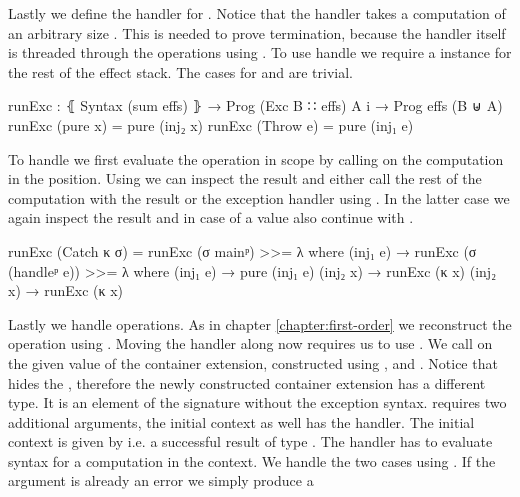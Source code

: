 Lastly we define the handler for .
Notice that the handler takes a computation of an arbitrary size
.
This is needed to prove termination, because the handler itself is threaded
through the  operations using
.
To use handle we require a  instance for the rest of the
effect stack.
The cases for  and
 are trivial.

\begin{code}
runExc : ⦃ Syntax (sum effs) ⦄ → Prog (Exc B ∷ effs) A {i} → Prog effs (B ⊎ A)
runExc (pure x)     = pure (inj₂ x)
runExc (Throw e)    = pure (inj₁ e)
\end{code}
To handle  we first evaluate the operation in
scope by calling  on the computation in the
 position.
Using \AgdaFunction{>>=} we can inspect the result and either call the rest of
the computation  with the result or the exception handler using
.
In the latter case we again inspect the result and in case of a value also
continue with .
\begin{code}
runExc (Catch κ σ)  = runExc (σ mainᵖ) >>= λ where
  (inj₁ e) → runExc (σ (handleᵖ e)) >>= λ where
    (inj₁ e) → pure (inj₁ e)
    (inj₂ x) → runExc (κ x)
  (inj₂ x) → runExc (κ x)
\end{code}
Lastly we handle  operations.
As in chapter \ref{chapter:first-order} we reconstruct the operation using
.
Moving the handler along now requires us to use .
We call  on the given value of the container extension,
constructed using ,  and .
Notice that  hides the
, therefore the newly constructed container
extension has a different type.
It is an element of the signature without the exception syntax.
 requires two additional arguments, the initial context as
well has the handler.
The initial context is given by
\AgdaSpace{} i.e. a
successful result of type .
The handler has to evaluate  syntax for a computation in the
context.
We handle the two cases using \AgdaFunction{[\_,\_]}.
If the argument is already an error we simply produce a
